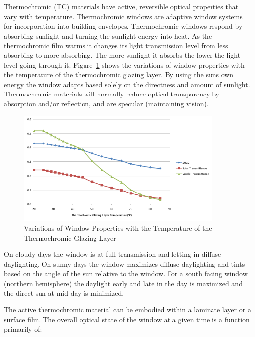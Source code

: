 Thermochromic (TC) materials have active, reversible optical properties that vary with temperature. Thermochromic windows are adaptive window systems for incorporation into building envelopes. Thermochromic windows respond by absorbing sunlight and turning the sunlight energy into heat. As the thermochromic film warms it changes its light transmission level from less absorbing to more absorbing. The more sunlight it absorbs the lower the light level going through it. Figure~\ref{fig:variations-of-window-properties-with} shows the variations of window properties with the temperature of the thermochromic glazing layer. By using the suns own energy the window adapts based solely on the directness and amount of sunlight. Thermochromic materials will normally reduce optical transparency by absorption and/or reflection, and are specular (maintaining vision).

\begin{figure}[hbtp] %
\centering
\includegraphics[width=0.9\textwidth, height=0.9\textheight, keepaspectratio=true]{media/image1015.svg.png}
\caption{Variations of Window Properties with the Temperature of the Thermochromic Glazing Layer \protect \label{fig:variations-of-window-properties-with}}
\end{figure}

On cloudy days the window is at full transmission and letting in diffuse daylighting. On sunny days the window maximizes diffuse daylighting and tints based on the angle of the sun relative to the window. For a south facing window (northern hemisphere) the daylight early and late in the day is maximized and the direct sun at mid day is minimized.

The active thermochromic material can be embodied within a laminate layer or a surface film. The overall optical state of the window at a given time is a function primarily of:

